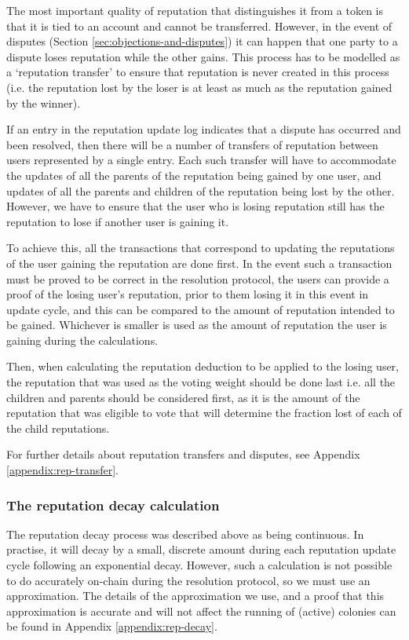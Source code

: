 The most important quality of reputation that distinguishes it from a token is that it is tied to an account and cannot be transferred. However, in the event of disputes (Section \ref{sec:objections-and-disputes}) it can happen that one party to a dispute loses reputation while the other gains. This process has to be modelled as a `reputation transfer' to ensure that reputation is never created in this process (i.e. the reputation lost by the loser is at least as much as the reputation gained by the winner).

If an entry in the reputation update log indicates that a dispute has occurred and been resolved, then there will be a number of transfers of reputation between users represented by a single entry. Each such transfer will have to accommodate the updates of all the parents of the reputation being gained by one user, and updates of all the parents and children of the reputation being lost by the other. However, we have to ensure that the user who is losing reputation still has the reputation to lose if another user is gaining it.

To achieve this, all the transactions that correspond to updating the reputations of the user gaining the reputation are done first. In the event such a transaction must be proved to be correct in the resolution protocol, the users can provide a proof of the losing user's reputation, prior to them losing it in this event in update cycle, and this can be compared to the amount of reputation intended to be gained. Whichever is smaller is used as the amount of reputation the user is gaining during the calculations.

Then, when calculating the reputation deduction to be applied to the losing user, the reputation that was used as the voting weight should be done last i.e. all the children and parents should be considered first, as it is the amount of the reputation that was eligible to vote that will determine the fraction lost of each of the child reputations. %

For further details about reputation transfers and disputes, see Appendix \ref{appendix:rep-transfer}.

\subsubsection{The reputation decay calculation}\label{sec:repdecay}
The reputation decay process was described above as being continuous. In practise, it will decay by a small, discrete amount during each reputation update cycle following an exponential decay. However, such a calculation is not possible to do accurately on-chain during the resolution protocol, so we must use an approximation. The details of the approximation we use, and a proof that this approximation is accurate and will not affect the running of (active) colonies can be found in Appendix \ref{appendix:rep-decay}.

